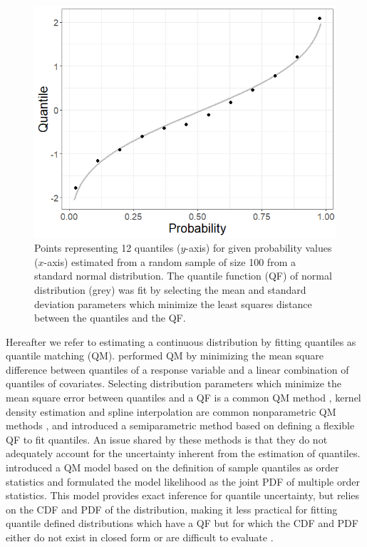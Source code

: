 \documentclass[preprint,12pt,authoryear]{elsarticle}
\begin{document}
\begin{figure}
    \centering
    \includegraphics[scale=.5]{Images/fit_quantiles_example.png}
    \caption{Points representing 12 quantiles ($y$-axis) for given probability values ($x$-axis) estimated from a random sample of size 100 from a standard normal distribution. The quantile function (QF) of normal distribution (grey) was fit by selecting the mean and standard deviation parameters which minimize the least squares distance between the quantiles and the QF.}
    \label{fig:quant_match_example}
\end{figure}

Hereafter we refer to estimating a continuous distribution by fitting quantiles as quantile matching (QM).
\cite{sgouropoulos2015matching} performed QM by minimizing the mean square difference between quantiles of a response variable and a linear combination of quantiles of covariates. Selecting distribution parameters which minimize the mean square error
between quantiles and a QF is a common QM method \cite[]{dilger2022distributions,li2019combining, belgorodski2017quantilemse}, 
kernel density estimation and spline interpolation are common nonparametric QM methods \cite[]{gerding2023evaluating,gyamerah2020probabilistic,he2016short}, and \cite{keelin2016metalog} introduced a semiparametric method based on defining a flexible QF to fit quantiles. An issue shared by these methods is that they do not adequately account for the uncertainty inherent from the estimation of quantiles.  \cite{nirwan2020bayesian} introduced a QM model based on the definition of sample quantiles as order statistics and formulated
the model likelihood as the joint PDF of multiple order statistics. This model provides exact inference for quantile uncertainty, but relies on the CDF and PDF of the distribution, making it less practical for fitting quantile defined distributions which have a QF but for which the CDF and PDF either do not exist in closed form or are difficult to evaluate \cite[]{perepolkin2023tenets,joiner1971some,tukey1960practical}. 
 
\end{document}
